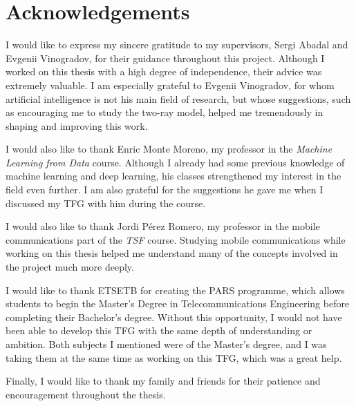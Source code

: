 \clearpage
\chapter*{Acknowledgements}
{}

I would like to express my sincere gratitude to my supervisors, Sergi Abadal and Evgenii Vinogradov, for their guidance throughout this project. Although I worked on this thesis with a high degree of independence, their advice was extremely valuable. I am especially grateful to Evgenii Vinogradov, for whom artificial intelligence is not his main field of research, but whose suggestions, such as encouraging me to study the two-ray model, helped me tremendously in shaping and improving this work.

I would also like to thank Enric Monte Moreno, my professor in the \textit{Machine Learning from Data} course. Although I already had some previous knowledge of machine learning and deep learning, his classes strengthened my interest in the field even further. I am also grateful for the suggestions he gave me when I discussed my TFG with him during the course.

I would also like to thank Jordi P\'erez Romero, my professor in the mobile communications part of the \textit{TSF} course. Studying mobile communications while working on this thesis helped me understand many of the concepts involved in the project much more deeply.

I would like to thank ETSETB for creating the PARS programme, which allows students to begin the Master's Degree in Telecommunications Engineering before completing their Bachelor's degree. Without this opportunity, I would not have been able to develop this TFG with the same depth of understanding or ambition. Both subjects I mentioned were of the Master's degree, and I was taking them at the same time as working on this TFG, which was a great help.

Finally, I would like to thank my family and friends for their patience and encouragement throughout the thesis.
